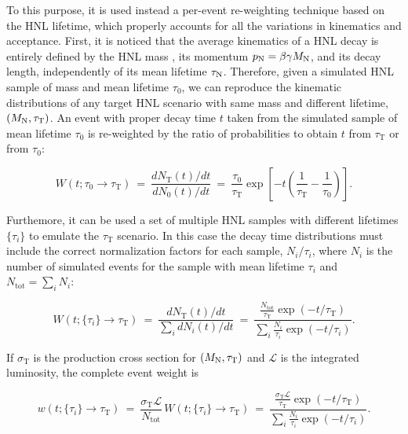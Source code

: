 To this purpose, it is used instead a per-event re-weighting technique
based on the HNL lifetime, which properly accounts for all the
variations in kinematics and acceptance.
First, it is noticed that the average kinematics of a HNL decay
is entirely defined by the HNL mass \mhnl, its momentum
$p_\mathrm{N}=\beta\gamma M_{\mathrm{N}}$, and its decay length,
independently of its mean lifetime $\tau_\mathrm{N}$.
Therefore, given a simulated HNL sample of mass \mhnl
and mean lifetime $\tau_0$, we can reproduce the kinematic
distributions of any target HNL scenario with same mass and 
different lifetime, $(M_{\mathrm{N}}, \tau_{\mathrm T})$.
An event with proper decay time $t$ taken from the simulated sample
of mean lifetime $\tau_0$ is re-weighted by the ratio of
probabilities to obtain $t$ from $\tau_{\mathrm T}$ or from $\tau_0$:
\begin{linenomath}
  \begin{equation}
    W(t; \tau_0\to\tau_{\mathrm T}) ~=~ \frac{dN_{\mathrm T}(t)/dt}{dN_0(t)/dt} ~=~
    \frac{\tau_0}{\tau_{\mathrm T}}\exp{\left[-t\left(\frac{1}{\tau_{\mathrm T}}-\frac{1}{\tau_0}\right)\right]}.
  \label{eq:ctauReweightingSingle}
  \end{equation}
\end{linenomath}
Furthemore, it can be used a set of multiple HNL samples with different lifetimes
$\{\tau_i\}$ to emulate the $\tau_{\mathrm T}$ scenario. In this case the
decay time distributions must include the correct normalization
factors for each sample, $N_i/\tau_i$, where $N_i$ is the number of
simulated events for the sample with mean lifetime $\tau_i$ and
$N_{\mathrm{tot}} = \sum_i N_i$:
\begin{linenomath}
  \begin{equation*}
    W(t; \{\tau_i\}\to\tau_{\mathrm T}) ~=~ \frac{dN_{\mathrm T}(t)/dt}{\sum_i dN_i(t)/dt} ~=~
    \frac{\frac{N_{\mathrm{tot}}}{\tau_{\mathrm{T}}}\exp{(-t/\tau_{\mathrm{T}})}}
         {\sum_i\frac{N_{i}}{\tau_i}\exp{(-t/\tau_i)}}.
  \end{equation*}
\end{linenomath}
If $\sigma_{\mathrm{T}}$ is the production cross section for
$(M_{\mathrm{N}},\tau_{\mathrm T})$ and $\mathcal{L}$ is the integrated luminosity,
the complete event weight is
\begin{linenomath}
  \begin{equation}
    w(t; \{\tau_i\}\to\tau_{\mathrm T}) ~=~
    \frac{\sigma_{\mathrm{T}}\mathcal{L}}{N_{\mathrm{tot}}}\,W(t;\{\tau_i\}\to\tau_{\mathrm T})
     ~=~ \frac{\frac{\sigma_{\mathrm{T}}\mathcal{L}}{\tau_{\mathrm{T}}}\exp{(-t/\tau_{\mathrm{T}})}}
         {\sum_i\frac{N_{i}}{\tau_i}\exp{(-t/\tau_i)}}.
  \label{eq:ctauReweighting}
  \end{equation}
\end{linenomath}
